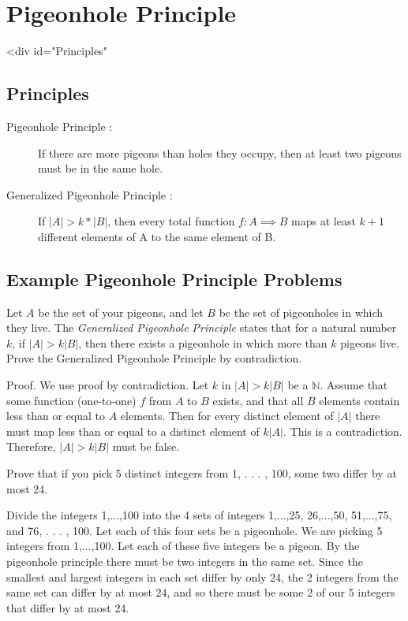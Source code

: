 \documentclass[solution, letterpaper]{cs20}
\begin{document}
	\section{Pigeonhole Principle}
    <div id="Principles"\>
	\subsection{Principles}
	\begin{description}
	    \item[Pigeonhole Principle :] If there are more pigeons than holes they occupy, then at least two pigeons must be in the same hole.

	    \item[Generalized Pigeonhole Principle :] If $|A| > k * |B|$, then every total function $ f : A \implies B$ maps at least $k + 1$ different elements of A to the same element of B.

	\end{description}
	\subsection{Example Pigeonhole Principle Problems}
	\problem{}{}
        Let $A$ be the set of your pigeons, and let $B$ be the set of pigeonholes in which they live. The \textit{Generalized Pigeonhole Principle} states that for a natural number $k$, if $|A| > k|B|$, then there exists a pigeonhole in which more than $k$ pigeons live. Prove the Generalized Pigeonhole Principle by contradiction.
    \begin{solution}
        Proof. We use proof by contradiction. Let $k$ in $\left\vert{A}\right\vert > k\left\vert{B}\right\vert$ be a $\mathbb{N}$.  Assume that some function (one-to-one) $f$ from $A$ to $B$ exists, and that all $B$ elements contain less than or equal to $A$ elements.  Then for every distinct element of $\left\vert{A}\right\vert$  there must map less than or equal to a distinct element of $k\left\vert{A}\right\vert$.  This is a contradiction.  Therefore, $\left\vert{A}\right\vert > k\left\vert{B}\right\vert$ must be false.
    \end{solution}

    \problem{}{}
        Prove that if you pick 5 distinct integers from {1, . . . , 100}, some two differ by at most 24.
    \begin{solution}
        Divide the integers {1,...,100} into the 4 sets of integers {1,...,25}, {26,...,50}, {51,...,75}, and {76, . . . , 100}. Let each of this four sets be a pigeonhole. We are picking 5 integers from {1,...,100}. Let each of these five integers be a pigeon. By the pigeonhole principle there must be two integers in the same set.
        Since the smallest and largest integers in each set differ by only 24, the 2 integers from the same set can differ by at most 24, and so there must be some 2 of our 5 integers that differ by at most 24.
    \end{solution}
\end{document}
